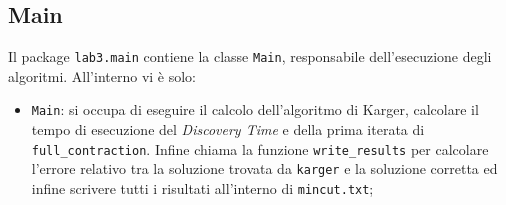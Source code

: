 \subsection{Main}
Il package \texttt{lab3.main} contiene la classe \texttt{Main}, responsabile dell'esecuzione degli algoritmi. All'interno vi è solo:
\begin{itemize}
	\item \texttt{Main}: si occupa di eseguire il calcolo dell'algoritmo di Karger, calcolare il tempo di esecuzione del \textit{Discovery Time} e della prima iterata di \texttt{full\_contraction}. Infine chiama la funzione \texttt{write\_results} per calcolare l'errore relativo tra la soluzione trovata da \texttt{karger} e la soluzione corretta ed infine scrivere tutti i risultati all'interno di \texttt{mincut.txt};
\end{itemize}